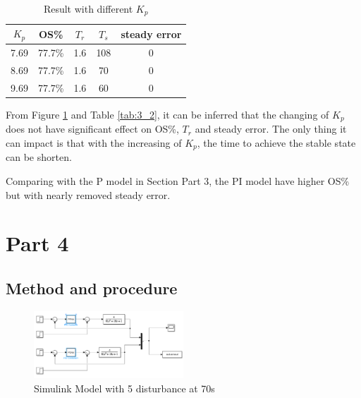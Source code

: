 \documentclass[11pt, a4paper]{article}
\begin{document}
\begin{table}[htbp]
\caption{Result with different $K_{p}$}
\label{tab:resp_3_2}
\begin{center}
\begin{tabular}{c||cccc}
\hline
$K_{p}$   &    OS\%      & $T_{r}$       & $T_{s}$   &  steady error \\
\hline
7.69  &   77.7\%         & 1.6          &  108     &  0     \\
8.69  &   77.7\%         & 1.6          &  70     &  0     \\
9.69  &   77.7\%         & 1.6          &   60    &  0     \\
\hline
\end{tabular}
\end{center}
\end{table}

From Figure \ref{tab:resp_3_2} and Table \ref{tab:3_2}, it can be inferred that the changing of $K_{p}$ does not have significant effect on OS\%, $T_{r}$ and steady error. The only thing it can impact is that with the increasing of $K_{p}$, the time to achieve the stable state can be shorten.

Comparing with the P model in Section Part 3, the PI model have higher OS\% but with nearly removed steady error.


\section{Part 4}

\subsection{Method and procedure}

\begin{figure}[htbp]     \begin{centering}
    \includegraphics[width=0.5\textwidth]{p4.png}
    \caption{\label{Fig:p4}Simulink Model with 5 disturbance at 70s}
    \end{centering}
    
\end{figure}
\end{document}
